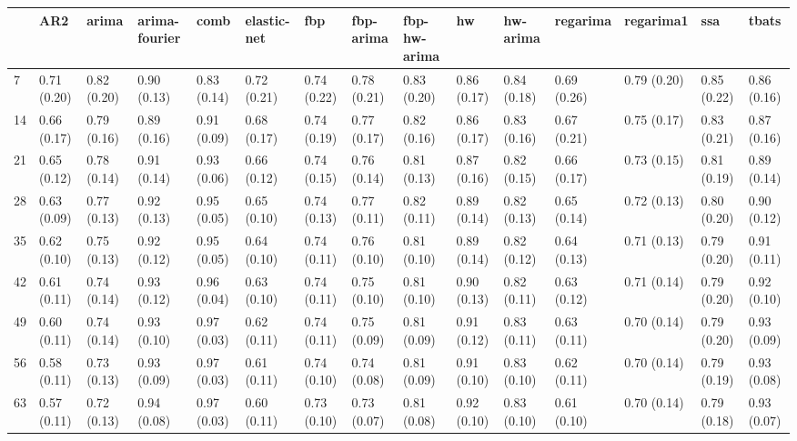 \begin{tabular}{lllllllllllllll}
\toprule
{} &          AR2 &        arima & arima-fourier &         comb &  elastic-net &          fbp &    fbp-arima & fbp-hw-arima &           hw &     hw-arima &     regarima &    regarima1 &          ssa &        tbats \\
\midrule
7   &  0.71 (0.20) &  0.82 (0.20) &   0.90 (0.13) &  0.83 (0.14) &  0.72 (0.21) &  0.74 (0.22) &  0.78 (0.21) &  0.83 (0.20) &  0.86 (0.17) &  0.84 (0.18) &  0.69 (0.26) &  0.79 (0.20) &  0.85 (0.22) &  0.86 (0.16) \\
14  &  0.66 (0.17) &  0.79 (0.16) &   0.89 (0.16) &  0.91 (0.09) &  0.68 (0.17) &  0.74 (0.19) &  0.77 (0.17) &  0.82 (0.16) &  0.86 (0.17) &  0.83 (0.16) &  0.67 (0.21) &  0.75 (0.17) &  0.83 (0.21) &  0.87 (0.16) \\
21  &  0.65 (0.12) &  0.78 (0.14) &   0.91 (0.14) &  0.93 (0.06) &  0.66 (0.12) &  0.74 (0.15) &  0.76 (0.14) &  0.81 (0.13) &  0.87 (0.16) &  0.82 (0.15) &  0.66 (0.17) &  0.73 (0.15) &  0.81 (0.19) &  0.89 (0.14) \\
28  &  0.63 (0.09) &  0.77 (0.13) &   0.92 (0.13) &  0.95 (0.05) &  0.65 (0.10) &  0.74 (0.13) &  0.77 (0.11) &  0.82 (0.11) &  0.89 (0.14) &  0.82 (0.13) &  0.65 (0.14) &  0.72 (0.13) &  0.80 (0.20) &  0.90 (0.12) \\
35  &  0.62 (0.10) &  0.75 (0.13) &   0.92 (0.12) &  0.95 (0.05) &  0.64 (0.10) &  0.74 (0.11) &  0.76 (0.10) &  0.81 (0.10) &  0.89 (0.14) &  0.82 (0.12) &  0.64 (0.13) &  0.71 (0.13) &  0.79 (0.20) &  0.91 (0.11) \\
42  &  0.61 (0.11) &  0.74 (0.14) &   0.93 (0.12) &  0.96 (0.04) &  0.63 (0.10) &  0.74 (0.11) &  0.75 (0.10) &  0.81 (0.10) &  0.90 (0.13) &  0.82 (0.11) &  0.63 (0.12) &  0.71 (0.14) &  0.79 (0.20) &  0.92 (0.10) \\
49  &  0.60 (0.11) &  0.74 (0.14) &   0.93 (0.10) &  0.97 (0.03) &  0.62 (0.11) &  0.74 (0.11) &  0.75 (0.09) &  0.81 (0.09) &  0.91 (0.12) &  0.83 (0.11) &  0.63 (0.11) &  0.70 (0.14) &  0.79 (0.20) &  0.93 (0.09) \\
56  &  0.58 (0.11) &  0.73 (0.13) &   0.93 (0.09) &  0.97 (0.03) &  0.61 (0.11) &  0.74 (0.10) &  0.74 (0.08) &  0.81 (0.09) &  0.91 (0.10) &  0.83 (0.10) &  0.62 (0.11) &  0.70 (0.14) &  0.79 (0.19) &  0.93 (0.08) \\
63  &  0.57 (0.11) &  0.72 (0.13) &   0.94 (0.08) &  0.97 (0.03) &  0.60 (0.11) &  0.73 (0.10) &  0.73 (0.07) &  0.81 (0.08) &  0.92 (0.10) &  0.83 (0.10) &  0.61 (0.10) &  0.70 (0.14) &  0.79 (0.18) &  0.93 (0.07) \\

\end{tabular}
